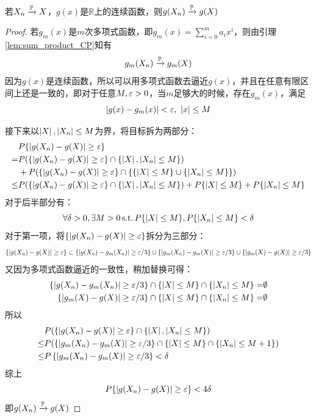 \begin{theorem}
    若$X_n \xrightarrow{\P} X$，$g(x)$是$\mathbb{R}$上的连续函数，则$g(X_n) \xrightarrow{\P} g(X)$
\end{theorem}
\begin{proof}
    若$g_m(x)$是$m$次多项式函数，即$g_m(x)=\sum_{i=0}^m a_ix^i$，则由引理\ref{lem:sum_product_CP}知有
    \[ g_m(X_n) \xrightarrow{\P} g_m(X) \]
    因为$g(x)$是连续函数，所以可以用多项式函数去逼近$g(x)$，并且在任意有限区间上还是一致的，即对于任意$M,\e >0$，当$m$足够大的时候，存在$g_m(x)$，满足
    \[ \abs{g(x)-g_m(x)} < \e ,\ \abs x \le M \]

    接下来以$\abs X ,\abs{X_n} \le M$为界，将目标拆为两部分：
    \begin{align*}
            & P\{|g(X_n)-g(X)| \ge \e \}                                                                              \\
        =   & P(\{|g(X_n)-g(X)| \ge \e \}\cap \{\abs X ,\abs{X_n} \le M \})                                           \\
            & +P(\{|g(X_n)-g(X)| \ge \e \}\cap \{\{\abs X \le M\} \cup \{\abs{X_n} \le M\} \})                        \\
        \le & P(\{|g(X_n)-g(X)| \ge \e \}\cap \{\abs X ,\abs{X_n} \le M \}) + P\{\abs X \le M\}+ P\{\abs{X_n} \le M\}
    \end{align*}
    对于后半部分有：
    \[ \forall \delta >0 , \exists M >0 \st P\{\abs X \le M\},P\{\abs{X_n} \le M\}< \delta \]
    对于第一项，将$\{|g(X_n)-g(X)| \ge \e \}$拆分为三部分：
    \[ \{|g(X_n)-g(X)| \ge \e \} \subset \{|g(X_n)-g_m(X_n)| \ge \e / 3 \} \cup \{|g_m(X_n)-g_m(X)| \ge \e / 3 \} \cup \{|g_m(X)-g(X)| \ge \e / 3 \} \]
    又因为多项式函数逼近的一致性，稍加替换可得：
    \begin{align*}
        \left\{|g(X_n)-g_m(X_n)| \ge \e / 3 \right\}\cap\{|X| \le M\} \cap\left\{|X_n| \le M \right\} = & \emptyset \\
        \left\{|g_m(X)-g(X)| \ge \e / 3 \right\}\cap\{|X| \le M\} \cap\left\{|X_n| \le M \right\} =     & \emptyset
    \end{align*}
    所以
    \begin{align*}
            & P(\{|g(X_n)-g(X)| \ge \e \}\cap \{\abs X ,\abs{X_n} \le M \})                                     \\
        \le & P(\left\{|g_m(X_n)-g_m(X)| \ge \e / 3\right\} \cap\{|X| \le M\} \cap\left\{|X_n| \le M+1\right\}) \\
        \le & P\left\{|g_m(X_n)-g_m(X)| \ge \e / 3\right\}<\delta
    \end{align*}
    综上
    \[ P\{|g(X_n)-g(X)| \ge \e \} < 4 \delta\]
    即$g(X_n) \xrightarrow{\P} g(X)$
\end{proof}


